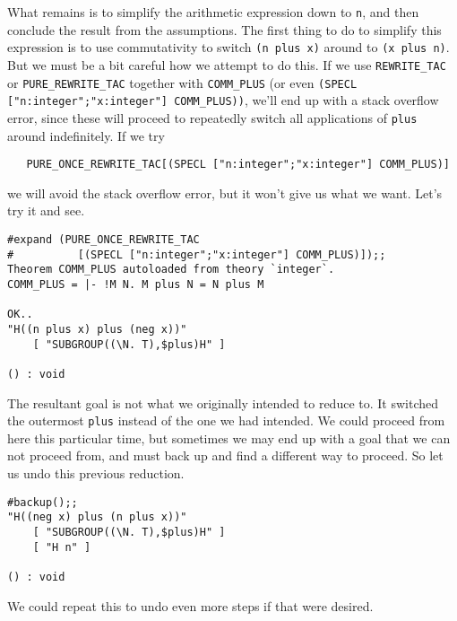 What remains is to simplify the arithmetic expression down to
{\small\tt n}, and then conclude the result from the assumptions.
The first thing to do to simplify this expression is to use
commutativity to switch {\small\verb+(n plus x)+} around to
{\small\verb+(x plus n)+}.  But we must be a bit careful how we
attempt to do this.  If we use {\small\verb+REWRITE_TAC+} or
{\small\verb+PURE_REWRITE_TAC+} together with
{\small\verb+COMM_PLUS+} (or even
{\small\verb+(SPECL ["n:integer";"x:integer"] COMM_PLUS))+},
we'll end up with a stack overflow error, since these will proceed to
repeatedly switch all applications of {\small\verb+plus+} around
indefinitely.  If we try
\begin{verbatim}
   PURE_ONCE_REWRITE_TAC[(SPECL ["n:integer";"x:integer"] COMM_PLUS)]
\end{verbatim}
we will avoid the stack overflow error, but it won't give us what we
want.  Let's try it and see.
\begin{session}
\begin{verbatim}
#expand (PURE_ONCE_REWRITE_TAC
#          [(SPECL ["n:integer";"x:integer"] COMM_PLUS)]);;
Theorem COMM_PLUS autoloaded from theory `integer`.
COMM_PLUS = |- !M N. M plus N = N plus M

OK..
"H((n plus x) plus (neg x))"
    [ "SUBGROUP((\N. T),$plus)H" ]

() : void
\end{verbatim}
\end{session}

The resultant goal is not what we originally intended to reduce to.
It switched the outermost {\small\verb+plus+} instead of the one
we had intended.  We could proceed from here this particular time, but
sometimes we may end up with a goal that we can not proceed from, and
must back up and find a different way to proceed.  So let us undo this
previous reduction.
\begin{session}
\begin{verbatim}
#backup();;
"H((neg x) plus (n plus x))"
    [ "SUBGROUP((\N. T),$plus)H" ]
    [ "H n" ]

() : void
\end{verbatim}
\end{session}
We could repeat this to undo even more steps if that were desired.

